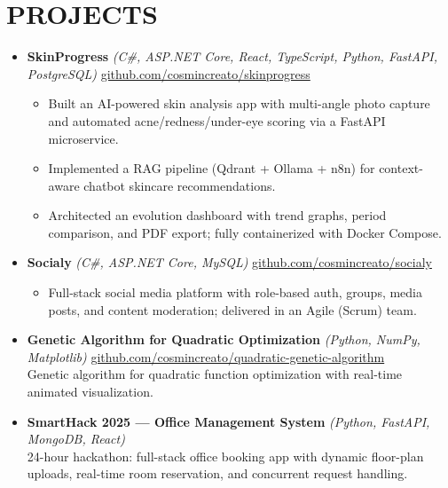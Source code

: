 \documentclass[10pt, letterpaper]{article}
\begin{document}
\section*{PROJECTS}
\begin{itemize}
  \item \textbf{SkinProgress} \textit{(C\#, ASP.NET Core, React, TypeScript, Python, FastAPI, PostgreSQL)} \hfill \href{https://github.com/cosmincreato/skinprogress}{github.com/cosmincreato/skinprogress}
        \begin{itemize}
          \item Built an AI-powered skin analysis app with multi-angle photo capture and automated acne/redness/under-eye scoring via a FastAPI microservice.
          \item Implemented a RAG pipeline (Qdrant + Ollama + n8n) for context-aware chatbot skincare recommendations.
          \item Architected an evolution dashboard with trend graphs, period comparison, and PDF export; fully containerized with Docker Compose.
        \end{itemize}

  \item \textbf{Socialy} \textit{(C\#, ASP.NET Core, MySQL)} \hfill \href{https://github.com/cosmincreato/socialy}{github.com/cosmincreato/socialy}
        \begin{itemize}
          \item Full-stack social media platform with role-based auth, groups, media posts, and content moderation; delivered in an Agile (Scrum) team.
        \end{itemize}

  \item \textbf{Genetic Algorithm for Quadratic Optimization} \textit{(Python, NumPy, Matplotlib)} \hfill \href{https://github.com/cosmincreato/quadratic-genetic-algorithm}{github.com/cosmincreato/quadratic-genetic-algorithm} \\
        Genetic algorithm for quadratic function optimization with real-time animated visualization.

  \item \textbf{SmartHack 2025 --- Office Management System} \textit{(Python, FastAPI, MongoDB, React)} \\
        24-hour hackathon: full-stack office booking app with dynamic floor-plan uploads, real-time room reservation, and concurrent request handling.
\end{itemize}
\end{document}
